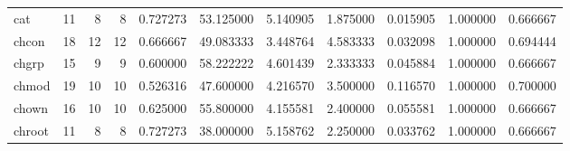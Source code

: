 \begin{longtable}{lrrrrrrrrrr}
cat       &                                      11 &                  8 &                                 8 &                                   0.727273 &                              53.125000 &                                     5.140905 &                          1.875000 &                                0.015905 &                           1.000000 &                                           0.666667 \\
chcon     &                                      18 &                 12 &                                12 &                                   0.666667 &                              49.083333 &                                     3.448764 &                          4.583333 &                                0.032098 &                           1.000000 &                                           0.694444 \\
chgrp     &                                      15 &                  9 &                                 9 &                                   0.600000 &                              58.222222 &                                     4.601439 &                          2.333333 &                                0.045884 &                           1.000000 &                                           0.666667 \\
chmod     &                                      19 &                 10 &                                10 &                                   0.526316 &                              47.600000 &                                     4.216570 &                          3.500000 &                                0.116570 &                           1.000000 &                                           0.700000 \\
chown     &                                      16 &                 10 &                                10 &                                   0.625000 &                              55.800000 &                                     4.155581 &                          2.400000 &                                0.055581 &                           1.000000 &                                           0.666667 \\
chroot    &                                      11 &                  8 &                                 8 &                                   0.727273 &                              38.000000 &                                     5.158762 &                          2.250000 &                                0.033762 &                           1.000000 &                                           0.666667 \\

\end{longtable}
